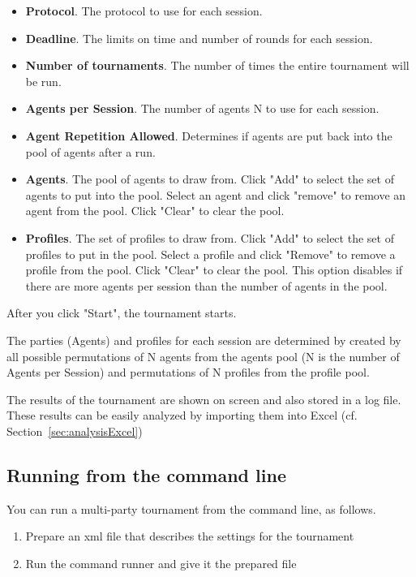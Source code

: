 \documentclass[]{article}
\begin{document}
\begin{itemize}
	\item \textbf{Protocol}. The protocol to use for each session.
	\item \textbf{Deadline}. The limits on time and number of rounds for each session.
	\item \textbf{Number of tournaments}. The number of times the entire tournament will be run.
	\item \textbf{Agents per Session}. The number of agents N to use for each session.
	\item \textbf{Agent Repetition Allowed}. Determines if agents are put back into the pool of agents after a run.
	\item \textbf{Agents}. The pool of agents to draw from. Click "Add" to select the set of agents to put into the pool. Select an agent and click "remove" to remove an agent from the pool. Click "Clear" to clear the pool.
	\item \textbf{Profiles}. The set of profiles to draw from. Click "Add" to select the set of profiles to put in the pool. Select a profile and click "Remove" to remove a profile from the pool. Click "Clear" to clear the pool. This option disables if there are more agents per session than the number of agents in the pool.
\end{itemize}

After you click "Start", the tournament starts. 

The parties (Agents) and profiles for each session are determined by created by all possible permutations of N agents from the agents pool (N is the number of Agents per Session) and permutations of N profiles from the profile pool. 
		
The results of the tournament are shown on screen and also stored in a log file.  These results can be easily analyzed by importing them into Excel (cf. Section~\ref{sec:analysisExcel})
	

\subsection{Running from the command line}
You can run a multi-party tournament from the command line, as follows.

\begin{enumerate}
\item Prepare an xml file that describes the settings for the tournament
\item Run the command runner and give it the prepared file 
\end{enumerate}
\end{document}
